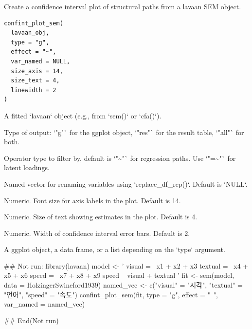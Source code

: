 \documentclass[a4paper]{book}
\begin{document}
%
\begin{Description}
Create a confidence interval plot of structural paths from a lavaan SEM object.
\end{Description}
%
\begin{Usage}
\begin{verbatim}
confint_plot_sem(
  lavaan_obj,
  type = "g",
  effect = "~",
  var_named = NULL,
  size_axis = 14,
  size_text = 4,
  linewidth = 2
)
\end{verbatim}
\end{Usage}
%
\begin{Arguments}
\begin{ldescription}
\item[\code{lavaan\_obj}] A fitted `lavaan` object (e.g., from `sem()` or `cfa()`).

\item[\code{type}] Type of output: `"g"` for the ggplot object, `"res"` for the result table, `"all"` for both.

\item[\code{effect}] Operator type to filter by, default is `"\textasciitilde{}"` for regression paths. Use `"=\textasciitilde{}"` for latent loadings.

\item[\code{var\_named}] Named vector for renaming variables using `replace\_df\_rep()`. Default is `NULL`.

\item[\code{size\_axis}] Numeric. Font size for axis labels in the plot. Default is 14.

\item[\code{size\_text}] Numeric. Size of text showing estimates in the plot. Default is 4.

\item[\code{linewidth}] Numeric. Width of confidence interval error bars. Default is 2.
\end{ldescription}
\end{Arguments}
%
\begin{Value}
A ggplot object, a data frame, or a list depending on the `type` argument.
\end{Value}
%
\begin{Examples}
\begin{ExampleCode}
\#\# Not run: 
library(lavaan)
model <- '
  visual  =~ x1 + x2 + x3
  textual =~ x4 + x5 + x6
  speed   =~ x7 + x8 + x9
  speed ~ visual + textual
'
fit <- sem(model, data = HolzingerSwineford1939)
named_vec <- c("visual" = "시각", "textual" = "언어", "speed" = "속도")
confint_plot_sem(fit, type = "g", effect = "~", var_named = named_vec)

## End(Not run)
\end{ExampleCode}
\end{Examples}
\end{document}
